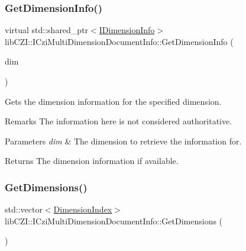 \subsubsection{\texorpdfstring{Get\+Dimension\+Info()}{GetDimensionInfo()}}
{\footnotesize\ttfamily virtual std\+::shared\+\_\+ptr$<$\hyperlink{classlib_c_z_i_1_1_i_dimension_info}{I\+Dimension\+Info}$>$ lib\+C\+Z\+I\+::\+I\+Czi\+Multi\+Dimension\+Document\+Info\+::\+Get\+Dimension\+Info (\begin{DoxyParamCaption}\item[{\hyperlink{namespacelib_c_z_i_a55049658acf59d0eddfaebcad16df424}{Dimension\+Index}}]{dim }\end{DoxyParamCaption})\hspace{0.3cm}{\ttfamily [pure virtual]}}

Gets the dimension information for the specified dimension. \begin{DoxyRemark}{Remarks}
The information here is not considered authoritative. 
\end{DoxyRemark}

\begin{DoxyParams}{Parameters}
{\em dim} & The dimension to retrieve the information for. \\
\hline
\end{DoxyParams}
\begin{DoxyReturn}{Returns}
The dimension information if available. 
\end{DoxyReturn}
\mbox{\label{classlib_c_z_i_1_1_i_czi_multi_dimension_document_info_aede2d6dd6e991151afff77b0cb96834a}} 
\subsubsection{\texorpdfstring{Get\+Dimensions()}{GetDimensions()}}
{\footnotesize\ttfamily std\+::vector$<$\hyperlink{namespacelib_c_z_i_a55049658acf59d0eddfaebcad16df424}{Dimension\+Index}$>$ lib\+C\+Z\+I\+::\+I\+Czi\+Multi\+Dimension\+Document\+Info\+::\+Get\+Dimensions (\begin{DoxyParamCaption}{ }\end{DoxyParamCaption})\hspace{0.3cm}{\ttfamily [inline]}}

